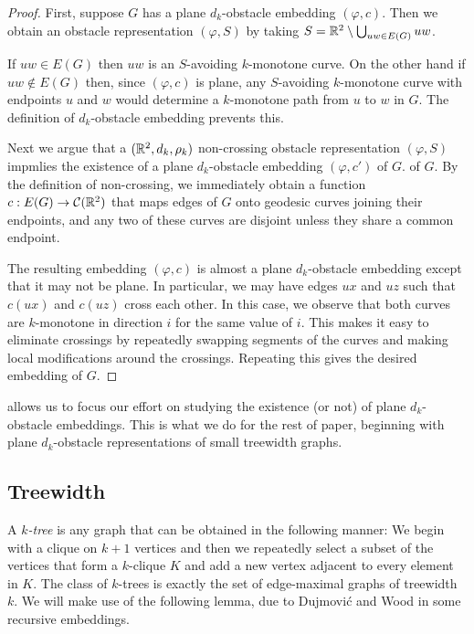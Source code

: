\documentclass{patmorin}
\begin{document}
\begin{proof}
   First, suppose $G$ has a plane $d_k$-obstacle embedding $(\varphi,c)$.
   Then we obtain an obstacle representation $(\varphi,S)$ by taking $S=
   \mathbb{R}^2\setminus \bigcup_{uw\in E(G)} uw$.  

   If $uw\in E(G)$ then $uw$ is an $S$-avoiding $k$-monotone curve.
   On the other hand if $uw\not\in E(G)$ then, since $(\varphi,c)$
   is plane, any $S$-avoiding $k$-monotone curve with endpoints $u$
   and $w$ would determine a $k$-monotone path from $u$ to $w$ in $G$.
   The definition of $d_k$-obstacle embedding prevents this.

   Next we argue that a $(\mathbb{R}^2,d_k,\rho_k)$ non-crossing obstacle
   representation $(\varphi, S)$ impmlies the existence of a plane
   $d_k$-obstacle embedding $(\varphi, c')$ of $G$.  of $G$.  By the
   definition of non-crossing, we immediately obtain a function
   $c:E(G)\to\mathcal{C}(\mathbb{R}^2)$ that maps edges of $G$ onto geodesic
   curves joining their endpoints, and any two of these curves are
   disjoint unless they share a common endpoint.

   The resulting embedding $(\varphi,c)$ is almost a plane $d_k$-obstacle
   embedding except that it may not be plane.  In particular, we may
   have edges $ux$ and $uz$ such that $c(ux)$ and $c(uz)$ cross each
   other.  In this case, we observe that both curves are $k$-monotone
   in direction $i$ for the same value of $i$.  This makes it easy to
   eliminate crossings by repeatedly swapping segments of the curves
   and making local modifications around the crossings.  Repeating this
   gives the desired embedding of $G$.
\end{proof}

 allows us to focus our effort on studying the existence
(or not) of plane $d_k$-obstacle embeddings.  This is what we do for
the rest of paper, beginning with plane $d_k$-obstacle representations
of small treewidth graphs.

\subsection{Treewidth}

A \emph{$k$-tree} is any graph that can be obtained in the following
manner:  We begin with a clique on $k+1$ vertices and then we
repeatedly select a subset of the vertices that form a $k$-clique $K$
and add a new vertex adjacent to every element in $K$.  The class of
$k$-trees is exactly the set of edge-maximal graphs of treewidth $k$.
We will make use of the following lemma, due to Dujmovi\'c and Wood
\cite[Lemma~1]{dujmovic.wood:graph2007} in some recursive embeddings.
\end{document}
